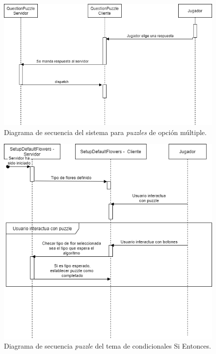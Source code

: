         \begin{figure}[H]
        \centering
        \includegraphics[width=0.8\linewidth]{images/DiagramaSecuenciaPuzzleOpcionMultiple.png}
        \caption{Diagrama de secuencia del sistema para \textit{puzzles} de opción múltiple.}
        \label{fig:diagrama_sec_opmul}
    \end{figure}
        \begin{figure}[H]
        \centering
        \includegraphics[width=0.8\linewidth]{images/DiagramaSecuenciaPuzzleIf.png}
        \caption{Diagrama de secuencia \textit{puzzle} del tema de condicionales Si Entonces.}
        \label{fig:diagrama_sec_if}
    \end{figure}
